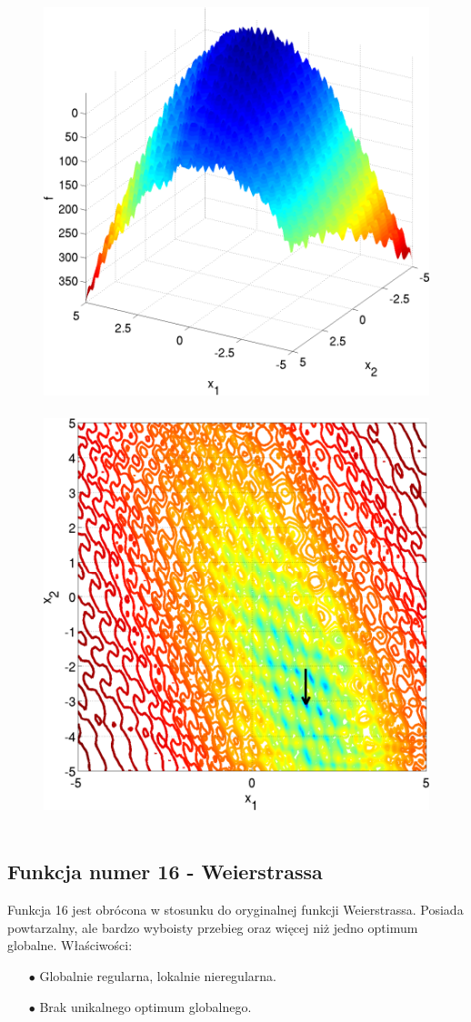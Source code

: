 \documentclass[a4paper,onecolumn,oneside,11pt,wide,floatssmall]{mwrep}
\theoremstyle{definition}
\theoremstyle{plain}%
\theoremstyle{remark}
\begin{document}
\begin{figure}[H]
\centering
\mbox{
\includegraphics[width=.45\textwidth]{img/15.png} \quad
\includegraphics[width=.45\textwidth]{img/15a.png} 
}
\end{figure}

\subsection{Funkcja numer 16 - Weierstrassa}

Funkcja 16 jest obrócona w stosunku do oryginalnej funkcji Weierstrassa. 
Posiada powtarzalny, ale bardzo wyboisty przebieg oraz więcej niż jedno optimum globalne. Właściwości:
\begin{itemize}
 \item[$\bullet$] Globalnie regularna, lokalnie nieregularna.
 \item[$\bullet$] Brak unikalnego optimum globalnego.
\end{itemize} 
\end{document}

